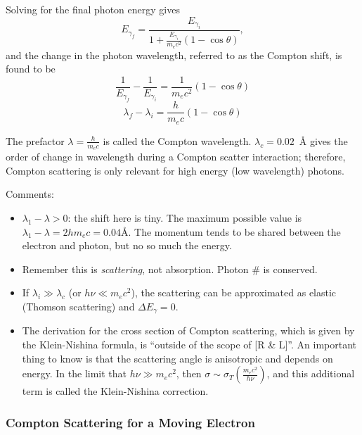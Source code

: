 \documentclass{article}
\begin{document}
Solving for the final photon energy gives
\begin{equation}
E_{\gamma_f} = \frac{E_{\gamma_i}}{1+\frac{E_{\gamma_i}}{m_ec^2}(1-\cos\theta)},
\label{eq:comptonenergy}
\end{equation}
and the change in the photon wavelength, referred to as the Compton shift, is found to be
$$\frac{1}{E_{\gamma_f}} - \frac{1}{E_{\gamma_i}} = \frac{1}{m_ec^2}(1-\cos\theta)$$
\begin{equation}
\lambda_f - \lambda_i = \frac{h}{m_e c}(1-\cos\theta)
\label{eq:comptonwavelength}
\end{equation}

The prefactor $\lambda = \frac{h}{m_e c}$ is called the Compton wavelength. $\lambda_c = 0.02$~\r{A} gives the order of change in wavelength during a Compton scatter interaction; therefore, Compton scattering is only relevant for high energy (low wavelength) photons.

Comments:
\begin{itemize}
\item $\lambda_1-\lambda>0$: the shift here is tiny.  The maximum possible
value is $\lambda_1-\lambda= 2h m_ec=0.04$\r{A}.  The momentum
tends to be shared between the electron and photon, but no so much the energy.
\item  Remember this is {\it scattering}, not absorption.  Photon \# is
conserved.
\item If $\lambda_i \gg \lambda_c$ (or $h\nu \ll m_e c^2$), the scattering can be approximated as elastic (Thomson scattering) and $\Delta E_\gamma = 0$.
\item 	The derivation for the cross section of Compton scattering, which is given by the Klein-Nishina formula, is ``outside of the scope of [R \& L]''. An important thing to know is that the scattering angle  is anisotropic and depends on energy. In the limit that $h\nu \gg m_e c^2$, then $\sigma \sim \sigma_T\left(\frac{m_e c^2}{h \nu}\right)$, and this additional term is called the Klein-Nishina correction.
\end{itemize}

\subsubsection{Compton Scattering for a Moving Electron}
\end{document}
